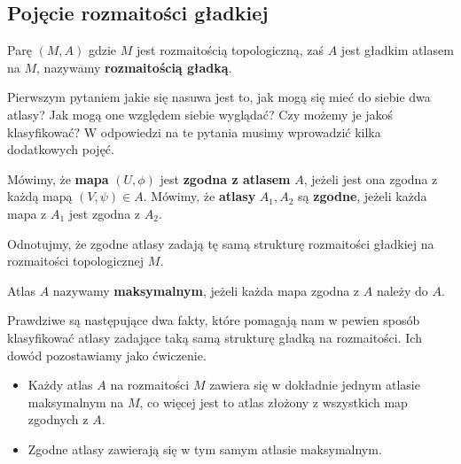 \subsection{Pojęcie rozmaitości gładkiej}
\begin{definition} 
	Parę $(M,A)$ gdzie $M$ jest rozmaitością topologiczną, zaś $A$ jest gładkim atlasem na $M$, nazywamy \textbf{rozmaitością gładką}.
\end{definition}

Pierwszym pytaniem jakie się nasuwa jest to, jak mogą się mieć do siebie dwa atlasy? Jak mogą one względem siebie wyglądać? Czy możemy je jakoś klasyfikować? W odpowiedzi na te pytania musimy wprowadzić kilka dodatkowych pojęć.

\begin{definition}
	Mówimy, że \textbf{mapa} $(U, \phi)$ jest \textbf{zgodna z atlasem} $A$, jeżeli jest ona zgodna z każdą mapą $(V,\psi) \in A$. Mówimy, że \textbf{atlasy} $A_1, A_2$ są \textbf{zgodne}, jeżeli każda mapa z $A_1$ jest zgodna z $A_2$.
\end{definition}
Odnotujmy, że zgodne atlasy zadają tę samą strukturę rozmaitości gładkiej na rozmaitości topologicznej $M$.

\begin{definition}
	Atlas $A$ nazywamy \textbf{maksymalnym}, jeżeli każda mapa zgodna z $A$ należy do $A$.
\end{definition}

Prawdziwe są następujące dwa fakty, które pomagają nam w pewien sposób klasyfikować atlasy zadające taką samą strukturę gładką na rozmaitości. Ich dowód pozostawiamy jako ćwiczenie.
\begin{itemize}
	\item Każdy atlas $A$ na rozmaitości $M$ zawiera się w dokładnie jednym atlasie maksymalnym na $M$, co więcej jest to atlas złożony z wszystkich map zgodnych z $A$.
	\item Zgodne atlasy zawierają się w tym samym atlasie maksymalnym.
\end{itemize}


